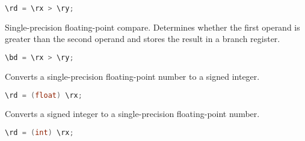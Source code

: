 \begin{lstlisting}[numbers=none, basicstyle=\ttfamily\footnotesize, language=C++]
\rd = \rx > \ry;
\end{lstlisting}

Single-precision floating-point compare. Determines whether the first operand is greater than the second operand and stores
the result in a branch register.

\begin{lstlisting}[numbers=none, basicstyle=\ttfamily\footnotesize, language=C++]
\bd = \rx > \ry;
\end{lstlisting}

%

%

Converts a single-precision floating-point number to a signed integer.

\begin{lstlisting}[numbers=none, basicstyle=\ttfamily\footnotesize, language=C++]
\rd = (float) \rx;
\end{lstlisting}

Converts a signed integer to a single-precision floating-point number.

\begin{lstlisting}[numbers=none, basicstyle=\ttfamily\footnotesize, language=C++]
\rd = (int) \rx;
\end{lstlisting}
